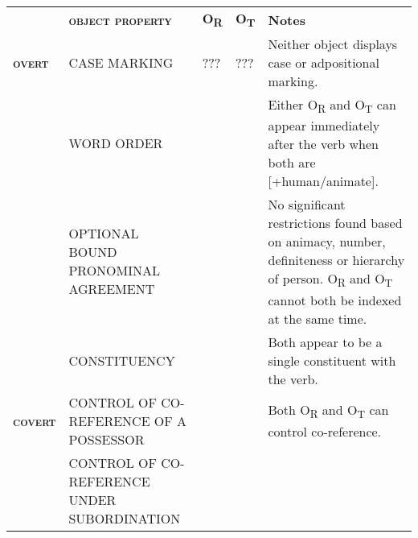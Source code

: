 \documentclass[output=paper]{langsci/langscibook}
\begin{document}
{{{{{{{\begin{tabular}{lllll} & \textbf{\textsc{object property}} & \textbf{O}\textbf{\textsubscript{R}} & \textbf{O}\textbf{\textsubscript{T}} & \textbf{Notes}\\
\lsptoprule
{ \textbf{\textsc{overt}}} & CASE MARKING & ??? & ??? & Neither object displays case or adpositional marking.\\
& WORD ORDER & 
\end{itemize} & 
\end{itemize} & Either O\textsubscript{R} and O\textsubscript{T} can appear immediately after the verb when both are [+human/animate]. \\
\hhline{~----} & OPTIONAL BOUND PRONOMINAL AGREEMENT & 
\end{itemize} & 
\end{itemize} & No significant restrictions found based on animacy, number, definiteness or hierarchy of person. O\textsubscript{R} and O\textsubscript{T} cannot both be indexed at the same time.\\
\hhline{~----} & CONSTITUENCY & 
\end{itemize} & 
\end{itemize} & Both appear to be a single constituent with the verb.\\
{ \textbf{\textsc{covert}}} & CONTROL OF CO-REFERENCE OF A POSSESSOR & 
\end{itemize} & 
\end{itemize} & Both O\textsubscript{R }and O\textsubscript{T} can control co-reference.\\
& CONTROL OF CO-REFERENCE UNDER SUBORDINATION & 

\end{tabular}}}}}}}}
\end{document}
